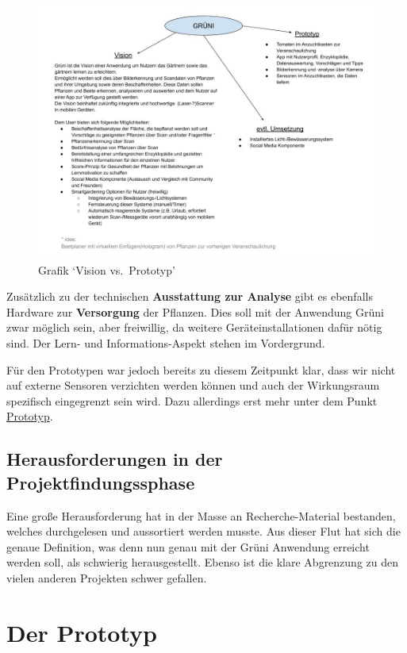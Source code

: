 \begin{figure}
\centering
\includegraphics{img/Projektthema.jpg}
\caption{Grafik `Vision vs.~Prototyp'}
\end{figure}

Zusätzlich zu der technischen \textbf{Ausstattung zur Analyse} gibt es
ebenfalls Hardware zur \textbf{Versorgung} der Pflanzen. Dies soll mit
der Anwendung Grüni zwar möglich sein, aber freiwillig, da weitere
Geräteinstallationen dafür nötig sind. Der Lern- und Informations-Aspekt
stehen im Vordergrund.

Für den Prototypen war jedoch bereits zu diesem Zeitpunkt klar, dass wir
nicht auf externe Sensoren verzichten werden können und auch der
Wirkungsraum spezifisch eingegrenzt sein wird. Dazu allerdings erst mehr
unter dem Punkt \protect\hyperlink{prototyp}{Prototyp}.

\hypertarget{herausforderungen-in-der-projektfindungssphase}{%
\subsection{Herausforderungen in der
Projektfindungssphase}\label{herausforderungen-in-der-projektfindungssphase}}

Eine große Herausforderung hat in der Masse an Recherche-Material
bestanden, welches durchgelesen und aussortiert werden musste. Aus
dieser Flut hat sich die genaue Definition, was denn nun genau mit der
Grüni Anwendung erreicht werden soll, als schwierig herausgestellt.
Ebenso ist die klare Abgrenzung zu den vielen anderen Projekten schwer
gefallen.

\hypertarget{prototyp}{%
\section{Der Prototyp}\label{prototyp}}

